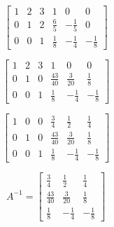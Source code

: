 \documentclass[a4paper, 14pt]{article}
\begin{document}
\[
\begin{bmatrix}
1 & 2 & 3 & 1 & 0 & 0 \\
0 & 1 & 2 & \frac{6}{5} & -\frac{1}{5} & 0 \\
0 & 0 & 1 & \frac{1}{8} & -\frac{1}{4} & -\frac{1}{8}
\end{bmatrix}
\]

\[
\begin{bmatrix}
1 & 2 & 3 & 1 & 0 & 0 \\
0 & 1 & 0 & \frac{43}{40} & \frac{3}{20} & \frac{1}{8} \\
0 & 0 & 1 & \frac{1}{8} & -\frac{1}{4} & -\frac{1}{8}
\end{bmatrix}
\]

\[
\begin{bmatrix}
1 & 0 & 0 & \frac{3}{4} & \frac{1}{2} & \frac{1}{4} \\
0 & 1 & 0 & \frac{43}{40} & \frac{3}{20} & \frac{1}{8} \\
0 & 0 & 1 & \frac{1}{8} & -\frac{1}{4} & -\frac{1}{8}
\end{bmatrix}
\]

\[
A^{-1} = \begin{bmatrix}
\frac{3}{4} & \frac{1}{2} & \frac{1}{4} \\
\frac{43}{40} & \frac{3}{20} & \frac{1}{8} \\
\frac{1}{8} & -\frac{1}{4} & -\frac{1}{8}
\end{bmatrix}
\]
\end{document}
